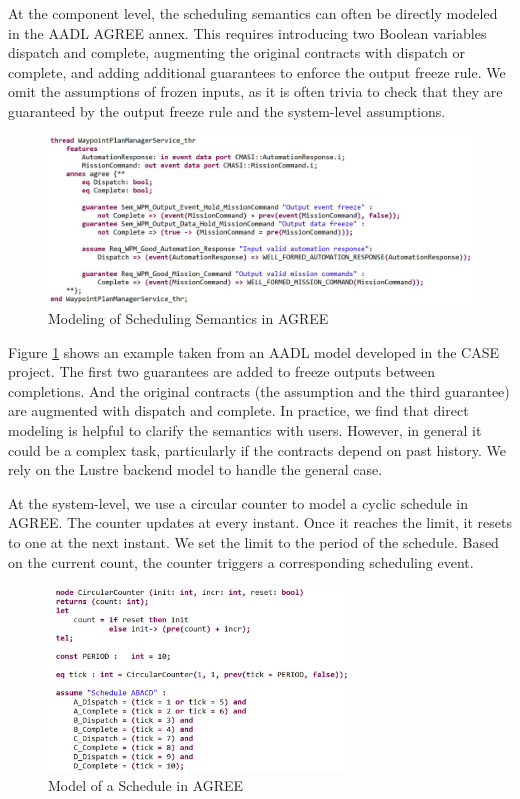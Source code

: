 At the component level, the scheduling semantics can often be directly modeled in the AADL AGREE annex. This requires introducing two Boolean variables dispatch and complete, augmenting the original contracts with dispatch or complete, and adding additional guarantees to enforce the output freeze rule. We omit the assumptions of frozen inputs, as it is often trivia to check that they are guaranteed by the output freeze rule and the system-level assumptions.

\begin{figure}[ht!]
\centering
\includegraphics[width=130mm]{wpmAGREE3.jpg}
\caption{Modeling of Scheduling Semantics in AGREE\label{wpmAGREE}}
\end{figure}

Figure \ref{wpmAGREE} shows an example taken from an AADL model developed in the CASE project. The first two guarantees are added to freeze outputs between completions. And the original contracts (the assumption and the third guarantee) are augmented with dispatch and complete.
In practice, we find that direct modeling is helpful to clarify the semantics with users. However, in general it could be a complex task, particularly if the contracts depend on past history. We rely on the Lustre backend model to handle the general case.

At the system-level, we use a circular counter to model a cyclic schedule in AGREE. 
The counter updates at every instant. Once it reaches the limit, it resets to one at the next instant.
We set the limit to the period of the schedule. 
Based on the current count, the counter triggers a corresponding scheduling event.

\begin{figure}[ht!]
\centering
\includegraphics[width=80mm]{schedule.jpg}
\caption{Model of a Schedule in AGREE\label{schedule}}
\end{figure}

